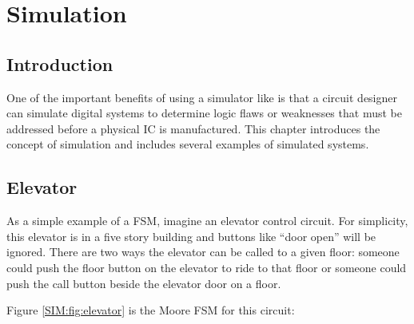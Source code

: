 \chapter{Simulation}\label{ch10}
\section{Introduction}

One of the important benefits of using a simulator like \Le is that a circuit designer can simulate digital systems to determine logic flaws or weaknesses that must be addressed before a physical \ac{IC} is manufactured. This chapter introduces the concept of simulation and includes several examples of simulated systems.

\section{Elevator}
\label{SIM:sec:elevator}

As a simple example of a \ac{FSM}, imagine an elevator control circuit. For simplicity, this elevator is in a five story building and buttons like ``door open'' will be ignored. There are two ways the elevator can be called to a given floor: someone could push the floor button on the elevator to ride to that floor or someone could push the call button beside the elevator door on a floor.

 Figure \ref{SIM:fig:elevator} is the Moore \ac{FSM} for this circuit:

